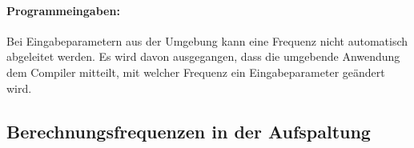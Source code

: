 \documentclass[twoside,a4paper,fleqn,12pt]{book}
\begin{document}
\paragraph{Programmeingaben:}
Bei Eingabeparametern aus der Umgebung kann eine Frequenz nicht automatisch abgeleitet werden.
Es wird davon ausgegangen, dass die umgebende Anwendung dem Compiler mitteilt, mit welcher Frequenz ein Eingabeparameter
geändert wird.\\



\subsection{Berechnungsfrequenzen in der Aufspaltung}
\label{splitter_Berechnungsfrequenzen}
\end{document}
